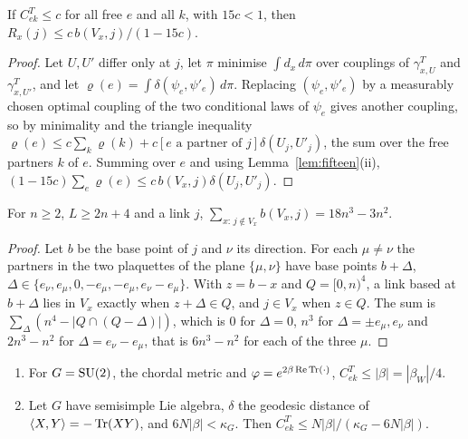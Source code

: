\begin{lemma}\label{lem:bpblock}
If $C^T_{ek}\le c$ for all free $e$ and all $k$, with $15c<1$, then
$R_x(j)\le c\,b(V_x,j)/(1-15c)$.
\end{lemma}

\begin{proof}
Let $U,U'$ differ only at $j$, let $\pi$ minimise $\int d_x\,d\pi$ over
couplings of $\gamma^T_{x,U}$ and $\gamma^T_{x,U'}$, and let $\varrho(e)=\int
\delta(\psi_e,\psi'_e)\,d\pi$. Replacing $(\psi_e,\psi'_e)$ by a measurably
chosen optimal coupling of the two conditional laws of $\psi_e$
\cite[Cor.~5.22]{Vil09} gives another coupling, so by minimality and the
triangle inequality $\varrho(e)\le c\sum_k\varrho(k)+c[e\text{ a partner of }j]
\delta(U_j,U'_j)$, the sum over the free partners $k$ of $e$. Summing over $e$
and using Lemma~\ref{lem:fifteen}(ii), $(1-15c)\sum_e\varrho(e)\le
c\,b(V_x,j)\delta(U_j,U'_j)$.
\end{proof}

\begin{lemma}\label{lem:bpcount}
For $n\ge2$, $L\ge2n+4$ and a link $j$, $\sum_{x:\,j\notin V_x}b(V_x,j)=
18n^3-3n^2$.
\end{lemma}

\begin{proof}
Let $b$ be the base point of $j$ and $\nu$ its direction. For each $\mu\ne\nu$
the partners in the two plaquettes of the plane $\{\mu,\nu\}$ have base points
$b+\Delta$, $\Delta\in\{e_\nu,e_\mu,0,-e_\mu,-e_\mu,e_\nu-e_\mu\}$. With $z=b-x$
and $Q=[0,n)^4$, a link based at $b+\Delta$ lies in $V_x$ exactly when $z+\Delta\in
Q$, and $j\in V_x$ when $z\in Q$. The sum is $\sum_\Delta(n^4-|Q\cap(Q-\Delta)|)$,
which is $0$ for $\Delta=0$, $n^3$ for $\Delta=\pm e_\mu,e_\nu$ and $2n^3-n^2$ for
$\Delta=e_\nu-e_\mu$, that is $6n^3-n^2$ for each of the three $\mu$.
\end{proof}

\begin{lemma}\label{lem:onelink}
\begin{enumerate}[label=\textup{(\roman*)},leftmargin=*]
\item For $G=\mathrm{SU}(2)$, the chordal metric and $\varphi=e^{2\beta\operatorname{Re}\operatorname{Tr}(\cdot)}$,
$C^T_{ek}\le|\beta|=|\beta_W|/4$.
\item Let $G$ have semisimple Lie algebra, $\delta$ the geodesic distance of
$\langle X,Y\rangle=-\operatorname{Tr}(XY)$, and $6N|\beta|<\kappa_G$. Then $C^T_{ek}\le N|\beta|/
(\kappa_G-6N|\beta|)$.
\end{enumerate}
\end{lemma}

